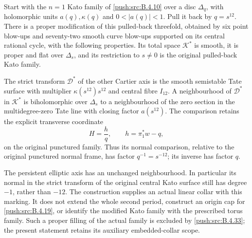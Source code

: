 \begin{proposition}\label{push:src:B.4.21}

Start with the $n=1$ Kato family of \ref{push:src:B.4.10} over a disc
$\Delta_q$, with holomorphic units $a(q),\kappa(q)$ and
$0<|a(q)|<1$.  Pull it back by $q=s^{12}$.
There is a proper modification of this pulled-back threefold,
obtained by six point blow-ups and seventy-two smooth curve
blow-ups supported on its central rational cycle, with the
following properties.  Its total space $\mathcal K^*$ is smooth,
it is proper and flat over $\Delta_s$, and its restriction to
$s\ne0$ is the original pulled-back Kato family.

The strict transform $\mathcal D^*$ of the other Cartier axis
is the smooth semistable Tate surface with multiplier
$\kappa(s^{12})s^{12}$ and central fibre $I_{12}$.  A neighbourhood
of $\mathcal D^*$ in $\mathcal K^*$ is biholomorphic over
$\Delta_s$ to a neighbourhood of the zero section in the
multidegree-zero Tate line with closing factor $a(s^{12})$.
The comparison retains the explicit transverse coordinate
\[
 H=\frac{h}{q},\qquad h=\pi_1^*w-q,
 \tag{B.4.21.1}
\]
on the original punctured family.  Thus its normal comparison,
relative to the original punctured normal frame, has factor
$q^{-1}=s^{-12}$; its inverse has factor $q$.

The persistent elliptic axis has an unchanged neighbourhood.
In particular its normal in the strict transform of the original
central Kato surface still has degree $-1$, rather than $-12$.
The construction supplies an actual linear collar with this
marking.  It does not extend the whole second period, construct
an origin cap for \ref{push:src:B.4.19}, or identify the modified Kato family
with the prescribed torus family. Such a proper filling of
the actual family is excluded by \ref{push:src:B.4.33}; the present
statement retains its auxiliary embedded-collar scope.
\end{proposition}


